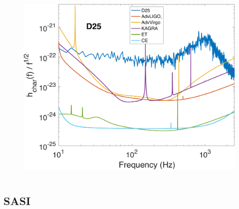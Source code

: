\documentclass[aspectratio=169]{beamer}
\begin{document}
\begin{frame}
\begin{columns}[c]
    \begin{figure}
      \includegraphics[width=1.0\textwidth]{Figures/D25_hchar.pdf}
    \end{figure}

  \end{columns}

\end{frame}

\subsection{SASI}
\end{document}
